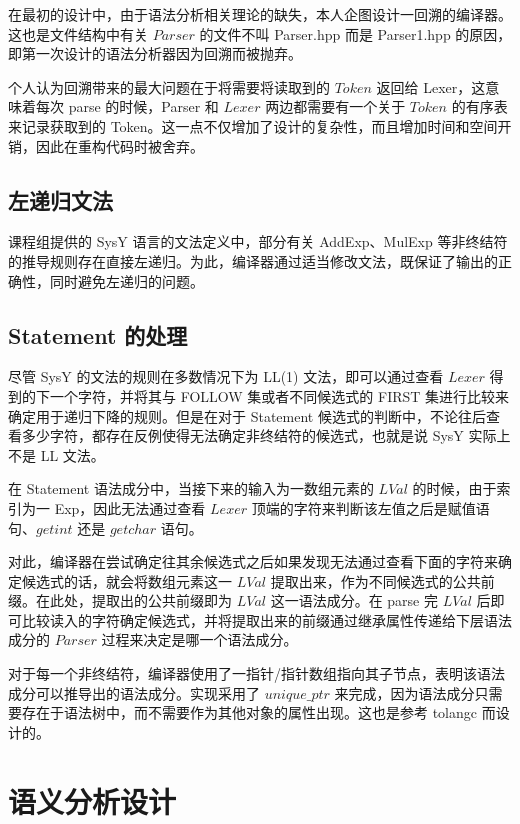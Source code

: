 \documentclass[a4paper]{article}
\begin{document}
			在最初的设计中，由于语法分析相关理论的缺失，本人企图设计一回溯的编译器。这也是文件结构中有关 $Parser$ 的文件不叫 Parser.hpp 而是 Parser1.hpp 的原因，即第一次设计的语法分析器因为回溯而被抛弃。
			
			个人认为回溯带来的最大问题在于将需要将读取到的 $Token$ 返回给 Lexer，这意味着每次 parse 的时候，Parser 和 $Lexer$ 两边都需要有一个关于 $Token$ 的有序表来记录获取到的 Token。这一点不仅增加了设计的复杂性，而且增加时间和空间开销，因此在重构代码时被舍弃。
        
        \subsection{左递归文法}

        	课程组提供的 SysY 语言的文法定义中，部分有关 AddExp、MulExp 等非终结符的推导规则存在直接左递归。为此，编译器通过适当修改文法，既保证了输出的正确性，同时避免左递归的问题。
        
        \subsection{Statement 的处理}
        
	        尽管 SysY 的文法的规则在多数情况下为 LL(1) 文法，即可以通过查看 $Lexer$ 得到的下一个字符，并将其与 FOLLOW 集或者不同候选式的 FIRST 集进行比较来确定用于递归下降的规则。但是在对于 Statement 候选式的判断中，不论往后查看多少字符，都存在反例使得无法确定非终结符的候选式，也就是说 SysY 实际上不是 LL 文法。
	        
	        在 Statement 语法成分中，当接下来的输入为一数组元素的 $LVal$ 的时候，由于索引为一 Exp，因此无法通过查看 $Lexer$ 顶端的字符来判断该左值之后是赋值语句、$getint$ 还是 $getchar$ 语句。
	        
	        对此，编译器在尝试确定往其余候选式之后如果发现无法通过查看下面的字符来确定候选式的话，就会将数组元素这一 $LVal$ 提取出来，作为不同候选式的公共前缀。在此处，提取出的公共前缀即为 $LVal$ 这一语法成分。在 parse 完 $LVal$ 后即可比较读入的字符确定候选式，并将提取出来的前缀通过继承属性传递给下层语法成分的 $Parser$ 过程来决定是哪一个语法成分。
        	
        对于每一个非终结符，编译器使用了一指针/指针数组指向其子节点，表明该语法成分可以推导出的语法成分。实现采用了 $unique\_ptr$ 来完成，因为语法成分只需要存在于语法树中，而不需要作为其他对象的属性出现。这也是参考 tolangc 而设计的。
			
	\section{语义分析设计}
		
\end{document}
